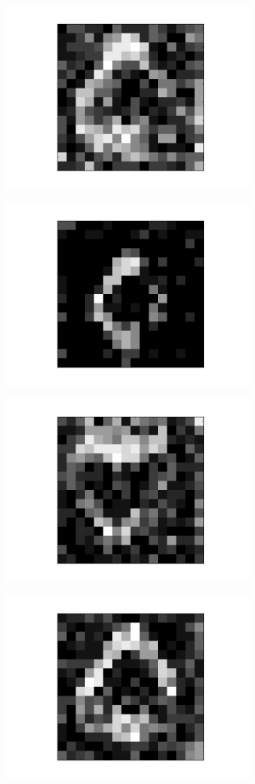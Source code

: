 \begin{figure}[h!]
	
	\begin{subfigure}{.25\textwidth}
  		\centering
  		\includegraphics[width=.6\linewidth]{imgs/poker/compl14.png}
  		\label{fig:sub1}
	\end{subfigure}%
	\begin{subfigure}{.25\textwidth}
  		\centering
  		\includegraphics[width=.6\linewidth]{imgs/poker/compl24.png}
  		\label{fig:sub1}
	\end{subfigure}%
	\begin{subfigure}{.25\textwidth}
  		\centering
  		\includegraphics[width=.6\linewidth]{imgs/poker/compl34.png}
  		\label{fig:sub1}
	\end{subfigure}%
	\begin{subfigure}{.25\textwidth}
  		\centering
  		\includegraphics[width=.6\linewidth]{imgs/poker/compl44.png}

\end{subfigure}
\end{figure}
